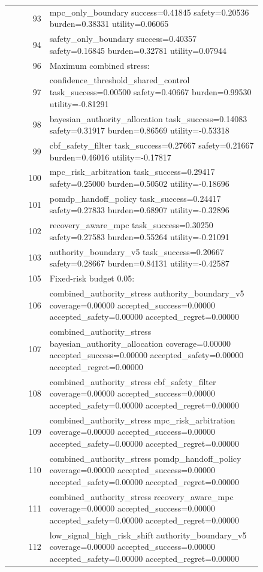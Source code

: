 \documentclass{article}
\begin{document}
\begin{center}
\begin{longtable}{rp{0.84\linewidth}}
93 & mpc\_only\_boundary success=0.41845 safety=0.20536 burden=0.38331 utility=0.06065\\
94 & safety\_only\_boundary success=0.40357 safety=0.16845 burden=0.32781 utility=0.07944\\
96 & Maximum combined stress:\\
97 & confidence\_threshold\_shared\_control task\_success=0.00500 safety=0.40667 burden=0.99530 utility=-0.81291\\
98 & bayesian\_authority\_allocation task\_success=0.14083 safety=0.31917 burden=0.86569 utility=-0.53318\\
99 & cbf\_safety\_filter task\_success=0.27667 safety=0.21667 burden=0.46016 utility=-0.17817\\
100 & mpc\_risk\_arbitration task\_success=0.29417 safety=0.25000 burden=0.50502 utility=-0.18696\\
101 & pomdp\_handoff\_policy task\_success=0.24417 safety=0.27833 burden=0.68907 utility=-0.32896\\
102 & recovery\_aware\_mpc task\_success=0.30250 safety=0.27583 burden=0.55264 utility=-0.21091\\
103 & authority\_boundary\_v5 task\_success=0.20667 safety=0.28667 burden=0.84131 utility=-0.42587\\
105 & Fixed-risk budget 0.05:\\
106 & combined\_authority\_stress authority\_boundary\_v5 coverage=0.00000 accepted\_success=0.00000 accepted\_safety=0.00000 accepted\_regret=0.00000\\
107 & combined\_authority\_stress bayesian\_authority\_allocation coverage=0.00000 accepted\_success=0.00000 accepted\_safety=0.00000 accepted\_regret=0.00000\\
108 & combined\_authority\_stress cbf\_safety\_filter coverage=0.00000 accepted\_success=0.00000 accepted\_safety=0.00000 accepted\_regret=0.00000\\
109 & combined\_authority\_stress mpc\_risk\_arbitration coverage=0.00000 accepted\_success=0.00000 accepted\_safety=0.00000 accepted\_regret=0.00000\\
110 & combined\_authority\_stress pomdp\_handoff\_policy coverage=0.00000 accepted\_success=0.00000 accepted\_safety=0.00000 accepted\_regret=0.00000\\
111 & combined\_authority\_stress recovery\_aware\_mpc coverage=0.00000 accepted\_success=0.00000 accepted\_safety=0.00000 accepted\_regret=0.00000\\
112 & low\_signal\_high\_risk\_shift authority\_boundary\_v5 coverage=0.00000 accepted\_success=0.00000 accepted\_safety=0.00000 accepted\_regret=0.00000\\

\end{longtable}
\end{center}
\end{document}
